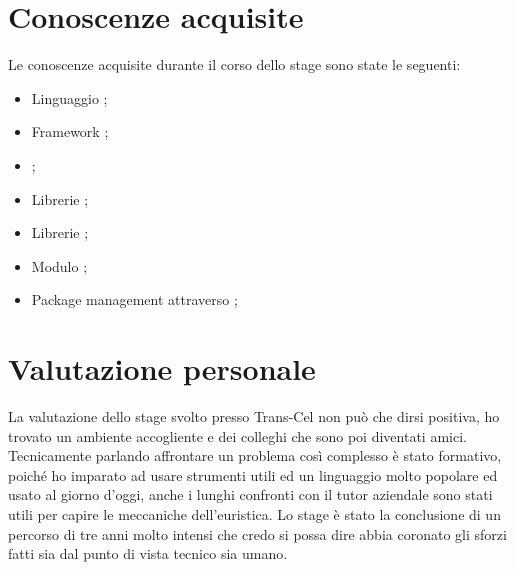 \section{Conoscenze acquisite}
Le conoscenze acquisite durante il corso dello stage sono state le seguenti:
\begin{itemize}
	\item Linguaggio ;
	\item Framework ;
	\item {};
	\item Librerie ;
	\item Librerie ;
	\item Modulo ;
	\item Package management attraverso ;
\end{itemize}

\section{Valutazione personale}
La valutazione dello stage svolto presso Trans-Cel non può che dirsi positiva, ho trovato un ambiente accogliente e dei colleghi che sono poi diventati amici. Tecnicamente parlando affrontare un problema così complesso è stato formativo, poiché ho imparato ad usare strumenti utili ed un linguaggio molto popolare ed usato al giorno d'oggi, anche i lunghi confronti con il tutor aziendale sono stati utili per capire le meccaniche dell'euristica. Lo stage è stato la conclusione di un percorso di tre anni molto intensi che credo si possa dire abbia coronato gli sforzi fatti sia dal punto di vista tecnico sia umano.